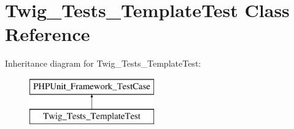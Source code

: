 \hypertarget{classTwig__Tests__TemplateTest}{}\section{Twig\+\_\+\+Tests\+\_\+\+Template\+Test Class Reference}
\label{classTwig__Tests__TemplateTest}
Inheritance diagram for Twig\+\_\+\+Tests\+\_\+\+Template\+Test\+:\begin{figure}[H]
\begin{center}
\leavevmode
\includegraphics[height=2.000000cm]{classTwig__Tests__TemplateTest}
\end{center}
\end{figure}
